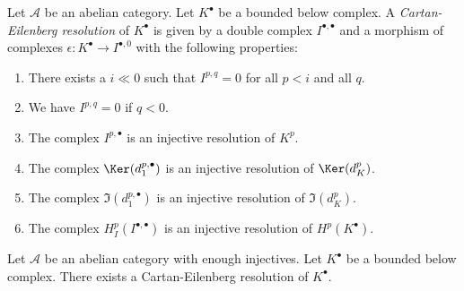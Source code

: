 \begin{definition}
\label{definition-cartan-eilenberg}
Let $\mathcal{A}$ be an abelian category.
Let $K^\bullet$ be a bounded below complex.
A {\it Cartan-Eilenberg resolution} of $K^\bullet$
is given by a double complex $I^{\bullet, \bullet}$
and a morphism of complexes $\epsilon : K^\bullet \to I^{\bullet, 0}$
with the following properties:
\begin{enumerate}
\item There exists a $i \ll 0$ such that $I^{p, q} = 0$ for all $p < i$
and all $q$.
\item We have $I^{p, q} = 0$ if $q < 0$.
\item The complex $I^{p, \bullet}$ is an injective resolution of $K^p$.
\item The complex $\Ker(d_1^{p, \bullet})$ is an injective resolution
of $\Ker(d_K^p)$.
\item The complex $\Im(d_1^{p, \bullet})$ is an injective resolution
of $\Im(d_K^p)$.
\item The complex $H^p_I(I^{\bullet, \bullet})$ is an injective resolution
of $H^p(K^\bullet)$.
\end{enumerate}
\end{definition}

\begin{lemma}
\label{lemma-cartan-eilenberg}
Let $\mathcal{A}$ be an abelian category with enough injectives.
Let $K^\bullet$ be a bounded below complex.
There exists a Cartan-Eilenberg resolution of $K^\bullet$.
\end{lemma}


